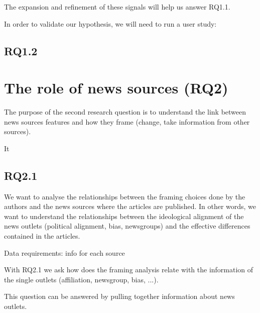The expansion and refinement of these signals will help us answer RQ1.1.


In order to validate our hypothesis, we will need to run a user study:



\subsection{RQ1.2}



\section{The role of news sources (RQ2)}
\label{sec:prop_rq2}

The purpose of the second research question is to understand the link between news sources features and how they frame (change, take information from other sources).

It 

\subsection{RQ2.1}
We want to analyse the relationships between the framing choices done by the authors and the news sources where the articles are published. In other words, we want to understand the relationships between the ideological alignment of the news outlets (political alignment, bias, newsgroups) and the effective differences contained in the articles.

Data requirements: info for each source




With RQ2.1 we ask how does the framing analysis relate with the information of the single outlets (affiliation, newsgroup, bias, ...).


This question can be answered by pulling together information about news outlets.

